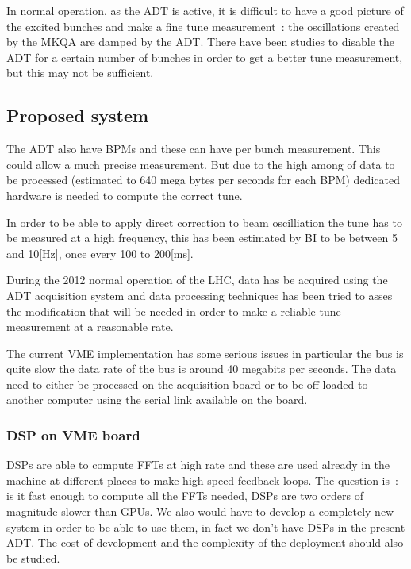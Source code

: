 In normal operation, as the \gls{ADT} is active, it is difficult to have a
good picture of the excited bunches and make a fine tune measurement~: the
oscillations created by the \gls{MKQA} are damped by the \gls{ADT}. There
have been studies to disable the \gls{ADT} for a certain number of bunches in
order to get a better tune measurement\cite{HofleEvian11}, but this may
not be sufficient.

\subsection{Proposed system}

The \gls{ADT} also have \glspl{BPM} and these can have per bunch 
measurement\cite{BphMeas07}. This could allow a much precise measurement. But due 
to the high among of data to be processed (estimated to 640 mega bytes per 
seconds for each \gls{BPM}) dedicated hardware is needed to compute the 
correct tune\cite{HofleChamonix12}.

In order to be able to apply direct correction to beam oscilliation the 
\gls{tune} has to be measured at a high frequency, this has been estimated by
\gls{BI} to be between 5 and 10[Hz], once every 100 to 200[ms].

During the 2012 normal operation of the \gls{LHC}, data has be acquired using
the \gls{ADT} acquisition system and data processing techniques has been 
tried to asses the modification that will be needed in order to make a 
reliable \gls{tune} measurement at a reasonable rate\cite{HofleChamonix12}.

The current \gls{VME} implementation has some serious issues in particular 
the bus is quite slow the data rate of the bus is around 40 megabits per 
seconds. The data need to either be processed on the acquisition board or 
to be off-loaded to another computer using the serial link available on the 
board\cite{Baudrenghien:1124094}.

\subsubsection{DSP on VME board}

\Glspl{DSP} are able to compute \glspl{FFT} at high rate and these are used
already in the machine at different places to make high speed feedback loops.
The question is~: is it fast enough to compute all the \glspl{FFT} needed, 
\glspl{DSP} are two orders of magnitude slower than \glspl{GPU}. We also 
would have to develop a completely new system in order to be able to use them, 
in fact we don't have \glspl{DSP} in the present \gls{ADT}. The cost of 
development and the complexity of the deployment should also be studied.

